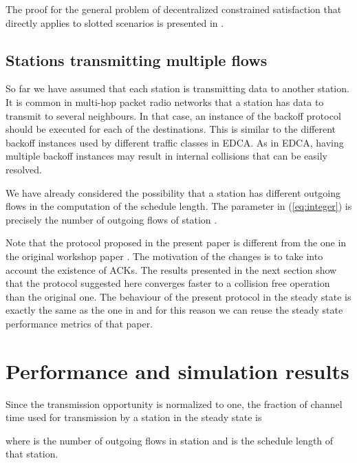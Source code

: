 \documentclass[twocolumn]{svjour3}          \smartqed  \usepackage{graphicx}
\begin{document}
The proof for the general problem of decentralized constrained satisfaction that directly applies to slotted scenarios is presented in \cite{duffy2011dcs}.













\subsection{Stations transmitting multiple flows}
So far we have assumed that each station is transmitting data to another station.
It is common in multi-hop packet radio networks that a station has data to transmit to several neighbours.
In that case, an instance of the backoff protocol should be executed for each of the destinations.
This is similar to the different backoff instances used by different traffic classes in EDCA.
As in EDCA, having multiple backoff instances may result in internal collisions that can be easily resolved.

We have already considered the possibility that a station has different outgoing flows in the computation of the schedule length.
The parameter  in (\ref{eq:integer}) is precisely the number of outgoing flows of station .

Note that the protocol proposed in the present paper is different from the one in the original workshop paper \cite{barcelo2011cfo}.
The motivation of the changes is to take into  account the existence of ACKs.
The results presented in the next section show that the protocol suggested here converges faster to a collision free operation than the original one.
The behaviour of the present protocol in the steady state is exactly the same as the one in \cite{barcelo2011cfo} and for this reason we can reuse the steady state performance metrics of that paper.


\section{Performance and simulation results}
\label{sec:simulation_results}

Since the transmission opportunity is normalized to one, the fraction of channel time used for transmission by a station  in the steady state is

where  is the number of outgoing flows in station  and  is the schedule length of that station.
\end{document}
